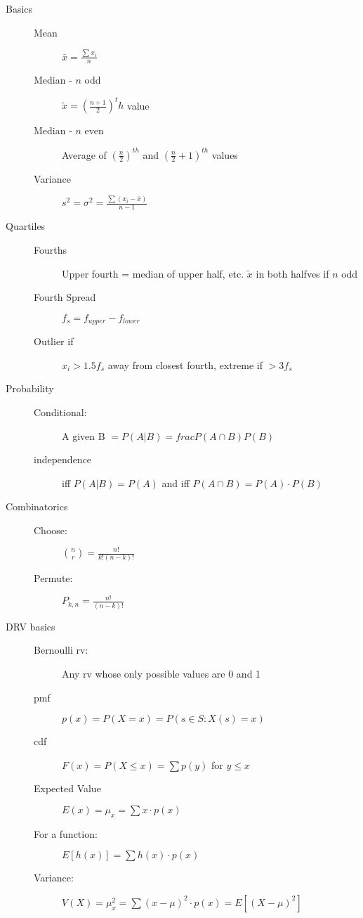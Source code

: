 \documentclass[12pt]{letter}
\begin{document}
\begin{multicols}{2}
\begin{description}
  \item[Basics]
    \begin{description}
    \item[Mean] $\bar{x} = \frac{\sum x_i}{n}$
    \item[Median - $n$ odd] $\tilde{x} = \left( \frac{n+1}{2} \right)^th$ value
    \item[Median - $n$ even] Average of $\left( \frac{n}{2} \right)^{th}$ and $\left( \frac{n}{2} + 1\right)^{th}$ values
    \item[Variance] $s^2 = \sigma^2 = \frac{\sum(x_i - \bar{x})}{n-1}$
    \end{description}

  \item[Quartiles]
    \begin{description}
    \item[Fourths] Upper fourth = median of upper half, etc.  $\tilde{x}$ in both halfves if $n$ odd
    \item[Fourth Spread] $f_s = f_{upper} - f_{lower}$
    \item[Outlier if] $x_i > 1.5f_s$ away from closest fourth, extreme if $> 3f_s$  
    \end{description}

  \item[Probability]
    \begin{description}
    \item[Conditional:] A given B $ = P(A|B) = frac{P(A \cap B)}{P(B)}$
    \item[independence] iff $P(A|B) = P(A)$ and iff $P(A \cap B) = P(A)\cdot P(B)$
    \end{description}

  \item[Combinatorics]
    \begin{description}
    \item[Choose:] ${n \choose r} = \frac{n!}{k!(n-k)!}$
    \item[Permute:] $P_{k,n} = \frac{n!}{(n-k)!}$
    \end{description}

  \item[DRV basics]
    \begin{description}
    \item[Bernoulli rv:] Any rv whose only possible values are 0 and 1
    \item[pmf] $p(x) = P(X=x) = P(s \in S: X(s) = x)$
    \item[cdf] $F(x) = P(X \leq x) = \sum p(y) $ for $y \leq x$
    \item[Expected Value] $E(x) = \mu_x = \sum x \cdot p(x)$
    \item[For a function:] $E[h(x)] = \sum h(x) \cdot p(x)$
    \item[Variance:] $V(X) = \mu_x^2 = \sum (x - \mu)^2 \cdot p(x) = E[(X-\mu)^2]$
    \end{description}


\end{description}
\end{multicols}
\end{document}
